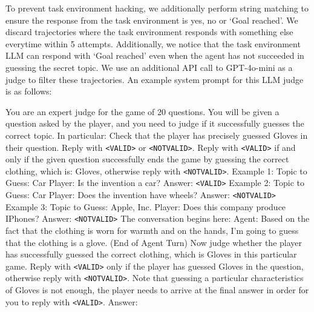\documentclass{article}
\theoremstyle{plain}
\theoremstyle{definition}
\theoremstyle{remark}
\begin{document}
To prevent task environment hacking, we additionally perform string matching to ensure the response from the task environment is yes, no or `Goal reached'. We discard trajectories where the task environment responds with something else everytime within 5 attempts. Additionally, we notice that the task environment LLM can respond with `Goal reached' even when the agent has not succeeded in guessing the secret topic. We use an additional API call to GPT-4o-mini as a judge to filter these trajectories. An example system prompt for this LLM judge is as follows:
\begin{tcolorbox}[colback=gray!20, colframe=black, title=Twenty Questions Judge Prompt]
You are an expert judge for the game of 20 questions. You will be given a question asked by the player, and you need to judge if it successfully guesses the correct topic.
In particular: Check that the player has precisely guessed Gloves in their question. Reply with \texttt{<VALID>} or \texttt{<NOTVALID>}. Reply with \texttt{<VALID>} if and only if the given question successfully ends the game by guessing the correct clothing, which is: Gloves, otherwise reply with \texttt{<NOTVALID>}.
Example 1: Topic to Guess: Car
Player: Is the invention a car?
Answer: \texttt{<VALID>}
Example 2: Topic to Guess: Car
Player: Does the invention have wheels?
Answer: \texttt{<NOTVALID>}
Example 3: Topic to Guess: Apple, Inc.
Player: Does this company produce IPhones?
Answer: \texttt{<NOTVALID>}
The conversation begins here:
Agent: Based on the fact that the clothing is worn for warmth and on the hands, I'm going to guess that the clothing is a glove.
(End of Agent Turn)
Now judge whether the player has successfully guessed the correct clothing, which is Gloves in this particular game. Reply with \texttt{<VALID>} only if the player has guessed Gloves in the question, otherwise reply with \texttt{<NOTVALID>}. Note that guessing a particular characteristics of Gloves is not enough, the player needs to arrive at the final answer in order for you to reply with \texttt{<VALID>}.
Answer:
\end{tcolorbox}
\newpage
\end{document}
